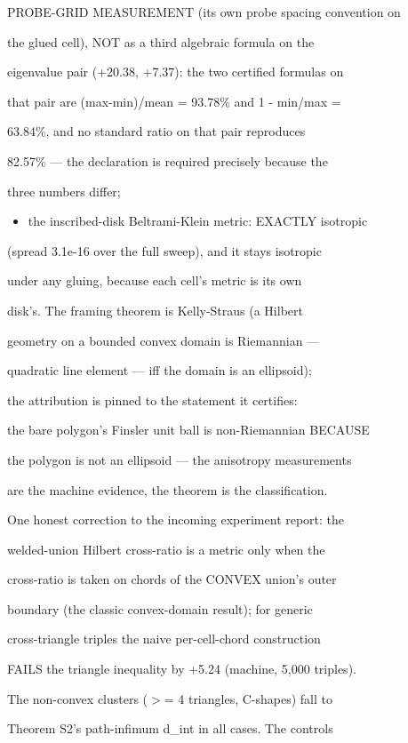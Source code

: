 \documentclass[11pt,a4paper]{article}
\theoremstyle{definition}
\begin{document}
    PROBE-GRID MEASUREMENT (its own probe spacing convention on

    the glued cell), NOT as a third algebraic formula on the

    eigenvalue pair (+20.38, +7.37): the two certified formulas on

    that pair are (max-min)/mean = 93.78\% and 1 - min/max =

    63.84\%, and no standard ratio on that pair reproduces

    82.57\% — the declaration is required precisely because the

    three numbers differ;

\begin{itemize}[leftmargin=1.4em]
\item the inscribed-disk Beltrami-Klein metric: EXACTLY isotropic
\end{itemize}
    (spread 3.1e-16 over the full sweep), and it stays isotropic

    under any gluing, because each cell's metric is its own

    disk's. The framing theorem is Kelly-Straus (a Hilbert

    geometry on a bounded convex domain is Riemannian —

    quadratic line element — iff the domain is an ellipsoid);

    the attribution is pinned to the statement it certifies:

    the bare polygon's Finsler unit ball is non-Riemannian BECAUSE

    the polygon is not an ellipsoid — the anisotropy measurements

    are the machine evidence, the theorem is the classification.


One honest correction to the incoming experiment report: the

welded-union Hilbert cross-ratio is a metric only when the

cross-ratio is taken on chords of the CONVEX union's outer

boundary (the classic convex-domain result); for generic

cross-triangle triples the naive per-cell-chord construction

FAILS the triangle inequality by +5.24 (machine, 5,000 triples).

The non-convex clusters ($>$= 4 triangles, C-shapes) fall to

Theorem S2's path-infimum d\_int in all cases. The controls
\end{document}
